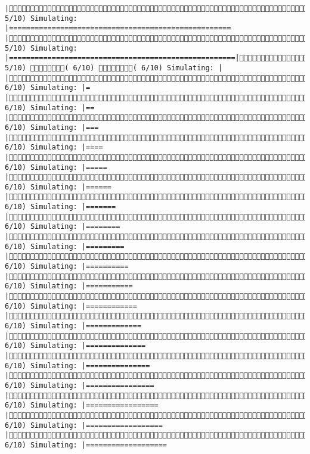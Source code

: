 \documentclass[]{article}
\begin{document}
\begin{verbatim}
|( 5/10) Simulating: |==================================================== |( 5/10) Simulating: |=====================================================|( 5/10) ( 6/10) ( 6/10) Simulating: |                                                     |( 6/10) Simulating: |=                                                    |( 6/10) Simulating: |==                                                   |( 6/10) Simulating: |===                                                  |( 6/10) Simulating: |====                                                 |( 6/10) Simulating: |=====                                                |( 6/10) Simulating: |======                                               |( 6/10) Simulating: |=======                                              |( 6/10) Simulating: |========                                             |( 6/10) Simulating: |=========                                            |( 6/10) Simulating: |==========                                           |( 6/10) Simulating: |===========                                          |( 6/10) Simulating: |============                                         |( 6/10) Simulating: |=============                                        |( 6/10) Simulating: |==============                                       |( 6/10) Simulating: |===============                                      |( 6/10) Simulating: |================                                     |( 6/10) Simulating: |=================                                    |( 6/10) Simulating: |==================                                   |( 6/10) Simulating: |===================                     
\end{verbatim}
\end{document}
